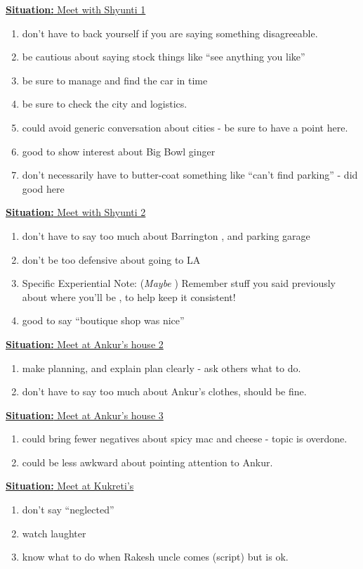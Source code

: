\documentclass[11pt]{article}
\newcommand{\newSituation}[1]{\underline{\textbf{Situation:} #1} }
\begin{document}
\newSituation{Meet with Shyunti 1}
\begin{enumerate} 
\item don't have to back yourself if you are saying something disagreeable. 
\item be cautious about saying stock things like ``see anything you like'' 
\item be sure to manage and find the car in time 
\item be sure to check the city and logistics. 
\item could avoid generic conversation about cities - be sure to have a point here. 
\item good to show interest about Big Bowl ginger 
\item don't necessarily have to butter-coat something like ``can't find parking'' - did good here
\end{enumerate}

\newSituation{Meet with Shyunti 2}
\begin{enumerate} 
\item don't have to say too much about Barrington , and parking garage 
\item don't be too defensive about going to LA 
\item Specific Experiential Note: (\textit{Maybe} ) Remember stuff you said previously about where you'll be , to help keep it consistent!
\item good to say ``boutique shop was nice'' 
\end{enumerate} 

\newSituation{Meet at Ankur's house 2}
\begin{enumerate} 
\item make planning, and explain plan clearly - ask others what to do. 
\item don't have to say too much about Ankur's clothes, should be fine. 
\end{enumerate} 

\newSituation{Meet at Ankur's house 3}
\begin{enumerate} 
\item could bring fewer negatives about spicy mac and cheese  - topic is overdone. 
\item could be less awkward about pointing attention to Ankur. 
\end{enumerate} 

\newSituation{Meet at Kukreti's}
\begin{enumerate} 
\item  don't say ``neglected''
\item  watch laughter
\item  know what to do when Rakesh uncle comes (script) but is ok.
\end{enumerate}
\end{document}
